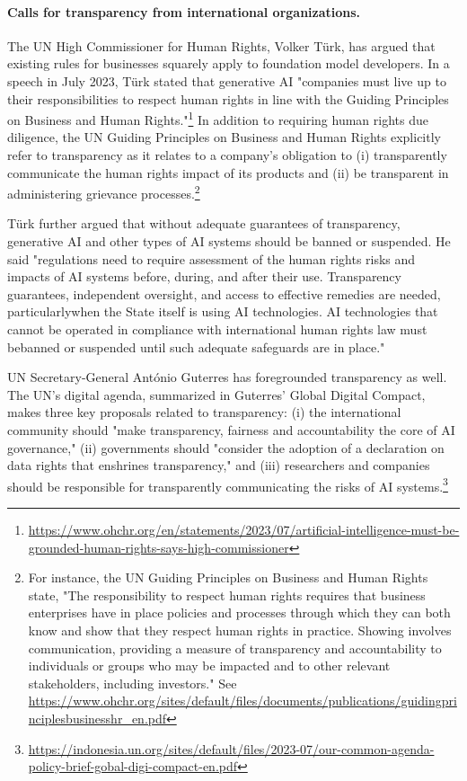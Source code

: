 \paragraph{\textbf{Calls for transparency from international organizations.}}
The UN High Commissioner for Human Rights, Volker Türk, has argued that existing rules for businesses squarely apply to foundation model developers. 
In a speech in July 2023, Türk stated that generative AI "companies must live up to their responsibilities to respect human rights in line with the Guiding Principles on Business and Human Rights."\footnote{\url{https://www.ohchr.org/en/statements/2023/07/artificial-intelligence-must-be-grounded-human-rights-says-high-commissioner}}
In addition to requiring human rights due diligence, the UN Guiding Principles on Business and Human Rights explicitly refer to transparency as it relates to a company's obligation to (i) transparently communicate the human rights impact of its products and (ii) be transparent in administering grievance processes.\footnote{For instance, the UN Guiding Principles on Business and Human Rights state, "The responsibility to respect human rights requires that business enterprises have in place policies and processes through which they can both know and show that they respect human rights in practice. Showing involves communication, providing a measure of transparency and accountability to individuals or groups who may be impacted and to other relevant stakeholders, including investors." See \url{https://www.ohchr.org/sites/default/files/documents/publications/guidingprinciplesbusinesshr_en.pdf}}

Türk further argued that without adequate guarantees of transparency, generative AI and other types of AI systems should be banned or suspended.
He said "regulations need to require assessment of the human rights risks and impacts of AI systems before, during, and after their use. Transparency guarantees, independent oversight, and access to effective remedies are needed, particularlywhen the State itself is using AI technologies. AI technologies that cannot be operated in compliance with international human rights law must bebanned or suspended until such adequate safeguards are in place."

UN Secretary-General António Guterres has foregrounded transparency as well. 
The UN's digital agenda, summarized in Guterres' Global Digital Compact, makes three key proposals related to transparency: (i) the international community should "make transparency, fairness and accountability the core of AI governance," (ii) governments should "consider the adoption of a declaration on data rights that enshrines transparency," and (iii) researchers and companies should be responsible for transparently communicating the risks of AI systems.\footnote{\url{https://indonesia.un.org/sites/default/files/2023-07/our-common-agenda-policy-brief-gobal-digi-compact-en.pdf}}

